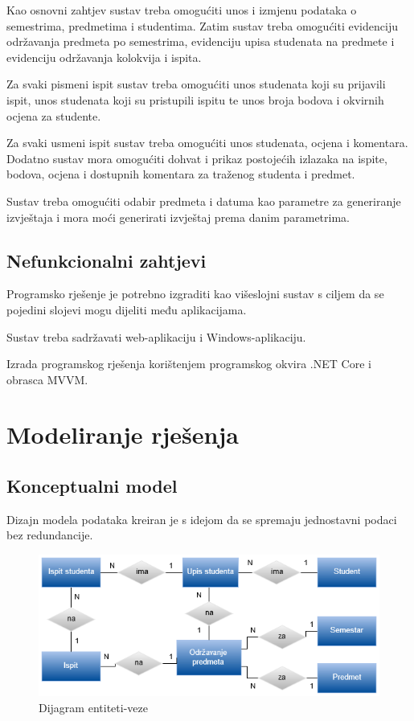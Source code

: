 \documentclass[times, utf8, diplomski]{fer}
\begin{document}
Kao osnovni zahtjev sustav treba omogućiti unos i izmjenu podataka o semestrima, predmetima i studentima.  Zatim sustav treba omogućiti evidenciju održavanja predmeta po semestrima, evidenciju upisa studenata na predmete i evidenciju održavanja kolokvija i ispita. 

Za svaki pismeni ispit sustav treba omogućiti unos studenata koji su prijavili ispit, unos studenata koji su pristupili ispitu te unos broja bodova i okvirnih ocjena za studente.

Za svaki usmeni ispit sustav treba omogućiti unos studenata, ocjena i komentara. Dodatno sustav mora omogućiti dohvat i prikaz postojećih izlazaka na ispite, bodova, ocjena i dostupnih komentara za traženog studenta i predmet. 

Sustav treba omogućiti odabir predmeta i datuma kao parametre za generiranje izvještaja i mora moći generirati izvještaj prema danim parametrima. 


\subsection{Nefunkcionalni zahtjevi}
Programsko rješenje je potrebno izgraditi kao višeslojni sustav s ciljem da se pojedini slojevi mogu dijeliti među aplikacijama.

Sustav treba sadržavati web-aplikaciju i Windows-aplikaciju.

Izrada programskog rješenja korištenjem programskog okvira .NET Core i obrasca MVVM.

\section{Modeliranje rješenja}
\subsection{Konceptualni model} \label{konceptualni_model}
Dizajn modela podataka kreiran je s idejom da se spremaju jednostavni podaci bez redundancije.

\begin{figure}[htb]
\centering
\includegraphics[width=12cm]{ev_diagram.png}
\caption{Dijagram entiteti-veze}
\label{fig:evd}
\end{figure}
\end{document}
